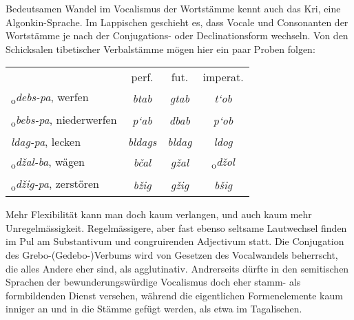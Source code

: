 \label{sp.391}

\largerpage[-6]Bedeutsamen Wandel im Vocalismus der Wortstämme kennt auch das Kri, eine Algonkin-Sprache. Im Lappischen geschieht es, dass Vocale und Consonanten der Wortstämme je nach der Conjugations- oder Declinationsform wechseln.  Von den Schicksalen tibetischer Verbalstämme mögen hier ein paar Proben folgen:

\begin{table}[h]
\centering
\tabcolsep=3mm
\begin{tabular}{l c c c}
& perf. & fut. & imperat. \\
\textsubscript{o}\textit{debs-pa}, werfen & \textit{btab} & \textit{gtab} & \textit{t‘ob} \\
\textsubscript{o}\textit{bebs-pa}, niederwerfen & \textit{p‘ab} & \textit{dbab} & \textit{p‘ob} \\
\textit{ldag-pa}, lecken & \textit{bldags} & \textit{bldag} & \textit{ldog} \\
\textsubscript{o}\textit{džal-ba}, wägen & \textit{bčal} & \textit{gžal} & \textsubscript{o}\textit{džol} \\
\textsubscript{o}\textit{džig-pa}, zerstören & \textit{bžig} & \textit{gžig} & \textit{bšig}
\end{tabular}
\end{table}

\noindent Mehr Flexibilität kann man doch kaum verlangen, und auch kaum mehr Unregelmässigkeit. Regelmässigere, aber fast ebenso seltsame Lautwechsel finden im Pul am Substantivum und congruirenden Adjectivum statt. Die Conjugation des Grebo-(Gedebo-)Verbums wird von Gesetzen des Vocalwandels beherrscht, die alles Andere eher sind, als agglutinativ. Andrerseits dürfte in den semitischen Sprachen der bewunderungswürdige Vocalismus doch eher stamm- als formbildenden Dienst versehen, während die eigentlichen Formenelemente kaum inniger an und in die Stämme gefügt werden, als etwa im Tagalischen.

